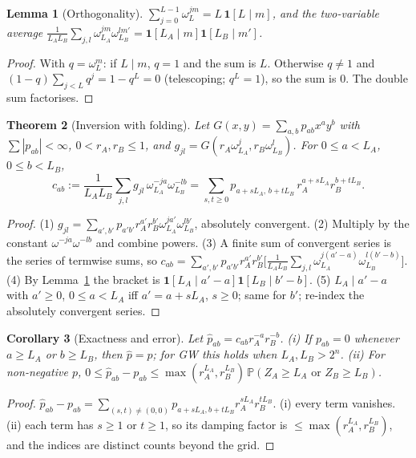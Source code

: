 \documentclass[11pt]{article}
\newtheorem{theorem}{Theorem}[section]
\newtheorem{lemma}[theorem]{Lemma}
\newtheorem{corollary}[theorem]{Corollary}
\theoremstyle{definition}
\theoremstyle{remark}
\newcommand{\Prob}{\mathbb{P}}
\newcommand{\one}{\mathbf 1}
\begin{document}
\begin{lemma}[Orthogonality]\label{lem:orth}
$\sum_{j=0}^{L-1}\omega_L^{jm}=L\,\one[L\mid m]$, and the two-variable average $\frac1{L_AL_B}\sum_{j,l}\omega_{L_A}^{jm}\omega_{L_B}^{lm'}=\one[L_A\mid m]\one[L_B\mid m']$.
\end{lemma}
\begin{proof}
With $q=\omega_L^m$: if $L\mid m$, $q=1$ and the sum is $L$. Otherwise $q\ne1$ and $(1-q)\sum_{j<L}q^j=1-q^L=0$ (telescoping; $q^L=1$), so the sum is 0. The double sum factorises.
\end{proof}

\begin{theorem}[Inversion with folding]\label{thm:fold}
Let $G(x,y)=\sum_{a,b}p_{ab}x^ay^b$ with $\sum|p_{ab}|<\infty$, $0<r_A,r_B\le1$, and $g_{jl}=G(r_A\omega_{L_A}^j,r_B\omega_{L_B}^l)$. For $0\le a<L_A$, $0\le b<L_B$,
\[
c_{ab}:=\frac1{L_AL_B}\sum_{j,l}g_{jl}\,\omega_{L_A}^{-ja}\omega_{L_B}^{-lb}=\sum_{s,t\ge0}p_{a+sL_A,\,b+tL_B}\,r_A^{a+sL_A}r_B^{b+tL_B}.
\]
\end{theorem}
\begin{proof}
(1) $g_{jl}=\sum_{a',b'}p_{a'b'}r_A^{a'}r_B^{b'}\omega_{L_A}^{ja'}\omega_{L_B}^{lb'}$, absolutely convergent. (2) Multiply by the constant $\omega^{-ja}\omega^{-lb}$ and combine powers. (3) A finite sum of convergent series is the series of termwise sums, so $c_{ab}=\sum_{a',b'}p_{a'b'}r_A^{a'}r_B^{b'}\big[\frac1{L_AL_B}\sum_{j,l}\omega_{L_A}^{j(a'-a)}\omega_{L_B}^{l(b'-b)}\big]$. (4) By Lemma~\ref{lem:orth} the bracket is $\one[L_A\mid a'-a]\one[L_B\mid b'-b]$. (5) $L_A\mid a'-a$ with $a'\ge0$, $0\le a<L_A$ iff $a'=a+sL_A$, $s\ge0$; same for $b'$; re-index the absolutely convergent series.
\end{proof}

\begin{corollary}[Exactness and error]\label{cor:fold}
Let $\hat p_{ab}=c_{ab}r_A^{-a}r_B^{-b}$. (i) If $p_{ab}=0$ whenever $a\ge L_A$ or $b\ge L_B$, then $\hat p=p$; for GW this holds when $L_A,L_B>2^n$. (ii) For non-negative $p$, $0\le\hat p_{ab}-p_{ab}\le\max(r_A^{L_A},r_B^{L_B})\,\Prob(Z_A\ge L_A\text{ or }Z_B\ge L_B)$.
\end{corollary}
\begin{proof}
$\hat p_{ab}-p_{ab}=\sum_{(s,t)\ne(0,0)}p_{a+sL_A,b+tL_B}r_A^{sL_A}r_B^{tL_B}$. (i) every term vanishes. (ii) each term has $s\ge1$ or $t\ge1$, so its damping factor is $\le\max(r_A^{L_A},r_B^{L_B})$, and the indices are distinct counts beyond the grid.
\end{proof}
\end{document}
